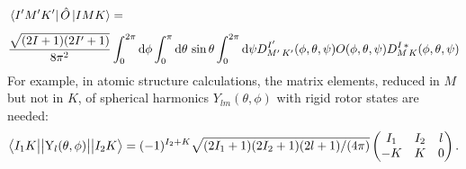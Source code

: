\begin{alignat}{2}
&\left< I^{\prime}M^{\prime}K^{\prime} \right|\hat{O}\left|IMK\right>=\\[4pt]
&
\frac{\sqrt{(2I+1)(2I^{\prime}+1)}}{8\pi^2}
\int_0^{2\pi}\text{d}\phi \int_0^{\pi}\text{d}\theta\,\sin\theta \int_0^{2\pi}\text{d}\psi
D^{I^{\prime}}_{M^{\prime}\,K^{\prime}}(\phi,\theta,\psi)O(\phi,\theta,\psi) D^{I\,*}_{M\,K}(\phi,\theta,\psi)\notag
\end{alignat}
For example, in atomic structure calculations, the matrix elements, reduced in $M$ but not in $K$, of spherical harmonics $Y_{lm}(\theta,\phi)$ with rigid rotor states are needed:
\begin{align}
\left< I_1K\big{|}\big{|}\text{Y}_l(\theta,\phi)\big{|}\big{|}I_2K\right>=(-1)^{I_2+K}
\sqrt{(2I_1+1)(2I_2+1)(2l+1)/(4\pi)}
\left(
\begin{matrix}
I_1&I_2&l\\
-K&K&0
\end{matrix}
\right).
\end{align}







